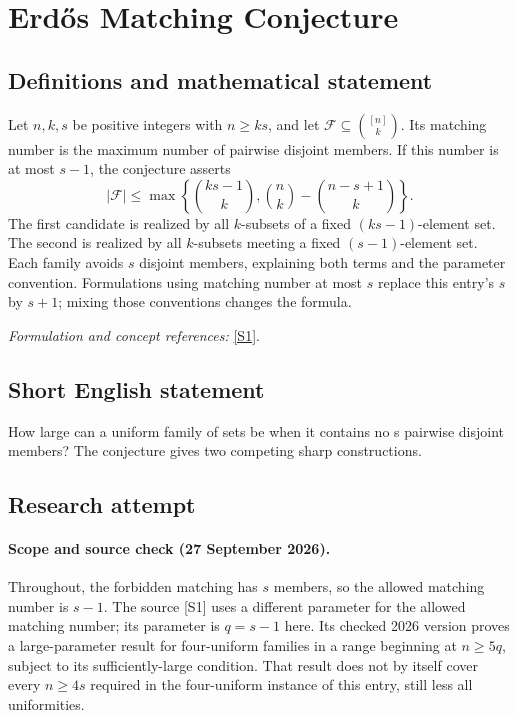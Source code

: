 \documentclass[11pt]{article}
\begin{document}
\section*{\texorpdfstring{Erdős Matching Conjecture}{Erdős Matching Conjecture}}\label{30006945}
\subsection{Definitions and mathematical statement}
Let $n,k,s$ be positive integers with $n\ge ks$, and let $\mathcal F\subseteq\binom{[n]}k$. Its matching number is the maximum number of pairwise disjoint members. If this number is at most $s-1$, the conjecture asserts
\[
 |\mathcal F|\le
 \max\left\{\binom{ks-1}{k},
 \binom nk-\binom{n-s+1}{k}\right\}.
\]
The first candidate is realized by all $k$-subsets of a fixed $(ks-1)$-element set. The second is realized by all $k$-subsets meeting a fixed $(s-1)$-element set. Each family avoids $s$ disjoint members, explaining both terms and the parameter convention. Formulations using matching number at most $s$ replace this entry's $s$ by $s+1$; mixing those conventions changes the formula.
\par\smallskip\textit{Formulation and concept references:} \href{https://arxiv.org/pdf/2602.19230}{[S1]}.

\subsection{Short English statement}
How large can a uniform family of sets be when it contains no s pairwise disjoint members? The conjecture gives two competing sharp constructions.
\subsection{Research attempt}
\paragraph{Scope and source check (27 September 2026).}
Throughout, the forbidden matching has $s$ members, so the allowed matching number is $s-1$. The source [S1] uses a different parameter for the allowed matching number; its parameter is $q=s-1$ here. Its checked 2026 version proves a large-parameter result for four-uniform families in a range beginning at $n\geq5q$, subject to its sufficiently-large condition. That result does not by itself cover every $n\geq4s$ required in the four-uniform instance of this entry, still less all uniformities.
\end{document}

